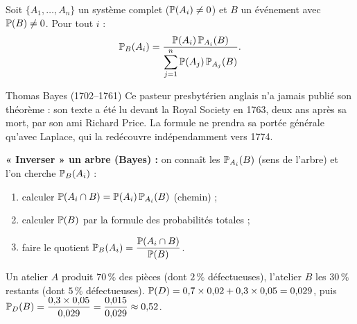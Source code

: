 \begin{theoreme}
	Soit $\{A_1,\ldots,A_n\}$ un système complet ($\mathbb{P}(A_i)\neq 0$) et $B$
	un événement avec $\mathbb{P}(B)\neq 0$. Pour tout $i$ :
	\[
	\mathbb{P}_B(A_i)
	= \frac{\mathbb{P}(A_i)\,\mathbb{P}_{A_i}(B)}
	       {\displaystyle\sum_{j=1}^{n}\mathbb{P}(A_j)\,\mathbb{P}_{A_j}(B)}.
	\]
\end{theoreme}

\begin{reperehisto}{Thomas Bayes (1702--1761)}
	Ce pasteur presbytérien anglais n'a jamais publié son théorème : son texte
	a été lu devant la Royal Society en 1763, deux ans après sa mort, par son
	ami Richard Price. La formule ne prendra sa portée générale qu'avec
	Laplace, qui la redécouvre indépendamment vers 1774.
\end{reperehisto}

\begin{methode}
	\textbf{« Inverser » un arbre (Bayes) :} on connaît les $\mathbb{P}_{A_i}(B)$
	(sens de l'arbre) et l'on cherche $\mathbb{P}_B(A_i)$ :
	\begin{enumerate}
		\item calculer $\mathbb{P}(A_i\cap B)=\mathbb{P}(A_i)\,\mathbb{P}_{A_i}(B)$ (chemin) ;
		\item calculer $\mathbb{P}(B)$ par la formule des probabilités totales ;
		\item faire le quotient
		$\mathbb{P}_B(A_i)=\dfrac{\mathbb{P}(A_i\cap B)}{\mathbb{P}(B)}$.
	\end{enumerate}
\end{methode}

\begin{exemple}
	Un atelier $A$ produit $70\,\%$ des pièces (dont $2\,\%$ défectueuses),
	l'atelier $B$ les $30\,\%$ restants (dont $5\,\%$ défectueuses).
	$\mathbb{P}(D)=0{,}7\times 0{,}02+0{,}3\times 0{,}05 = 0{,}029$, puis
	$\mathbb{P}_D(B)=\dfrac{0{,}3\times 0{,}05}{0{,}029}=\dfrac{0{,}015}{0{,}029}
	\approx 0{,}52$.
\end{exemple}

